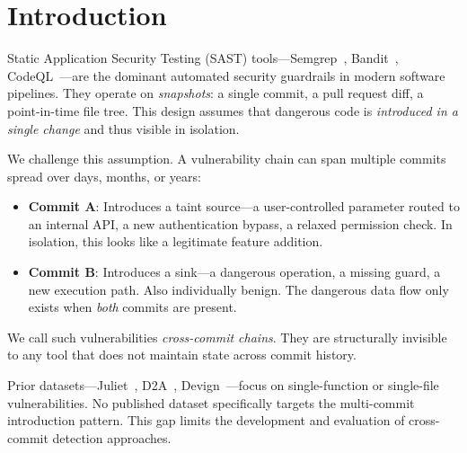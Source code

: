 \documentclass[sigconf,review]{acmart}
\begin{document}

\maketitle

\section{Introduction}

Static Application Security Testing (SAST) tools—Semgrep~\cite{semgrep}, Bandit~\cite{bandit},
CodeQL~\cite{codeql}—are the dominant automated security guardrails in modern software pipelines.
They operate on \emph{snapshots}: a single commit, a pull request diff, a point-in-time file tree.
This design assumes that dangerous code is \emph{introduced in a single change} and
thus visible in isolation.

We challenge this assumption. A vulnerability chain can span multiple commits
spread over days, months, or years:
\begin{itemize}
  \item \textbf{Commit A}: Introduces a taint source—a user-controlled parameter routed to an
        internal API, a new authentication bypass, a relaxed permission check.
        In isolation, this looks like a legitimate feature addition.
  \item \textbf{Commit B}: Introduces a sink—a dangerous operation, a missing guard, a new
        execution path. Also individually benign. The dangerous data flow only
        exists when \emph{both} commits are present.
\end{itemize}
We call such vulnerabilities \emph{cross-commit chains}. They are structurally invisible
to any tool that does not maintain state across commit history.

Prior datasets—Juliet~\cite{juliet}, D2A~\cite{d2a}, Devign~\cite{devign}—focus on
single-function or single-file vulnerabilities. No published dataset specifically targets
the multi-commit introduction pattern. This gap limits the development and evaluation
of cross-commit detection approaches.
\end{document}
